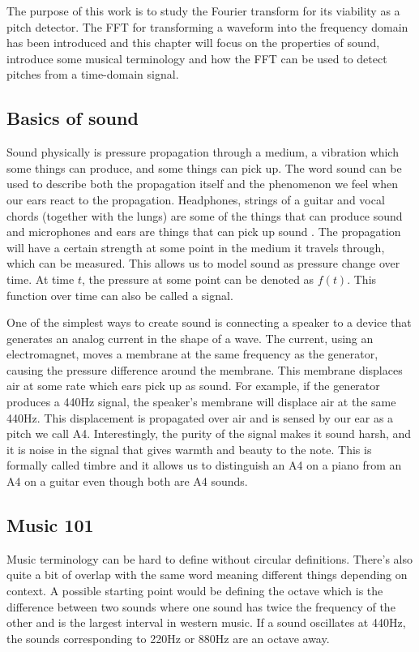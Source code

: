 The purpose of this work is to study the Fourier transform for its viability as a pitch detector. The FFT for transforming a waveform into the frequency domain has been introduced and this chapter will focus on the properties of sound, introduce some musical terminology and how the FFT can be used to detect pitches from a time-domain signal.

\subsection{Basics of sound}
Sound physically is pressure propagation through a medium, a vibration which some things can produce, and some things can pick up. The word sound can be used to describe both the propagation itself and the phenomenon we feel when our ears react to the propagation. Headphones, strings of a guitar and vocal chords (together with the lungs) are some of the things that can produce sound and microphones and ears are things that can pick up sound \cite{RossingMooreWheeler}. The propagation will have a certain strength at some point in the medium it travels through, which can be measured. This allows us to model sound as pressure change over time. At time $t$, the pressure at some point can be denoted as $f(t)$. This function over time can also be called a signal.

One of the simplest ways to create sound is connecting a speaker to a device that generates an analog current in the shape of a wave. The current, using an electromagnet, moves a membrane at the same frequency as the generator, causing the pressure difference around the membrane. This membrane displaces air at some rate which ears pick up as sound. For example, if the generator produces a 440Hz signal, the speaker's membrane will displace air at the same 440Hz. This displacement is propagated over air and is sensed by our ear as a pitch we call A4. Interestingly, the purity of the signal makes it sound harsh, and it is noise in the signal that gives warmth and beauty to the note. This is formally called timbre and it allows us to distinguish an A4 on a piano from an A4 on a guitar even though both are A4 sounds.


\subsection{Music 101} 
Music terminology can be hard to define without circular definitions. There's also quite a bit of overlap with the same word meaning different things depending on context. A possible starting point would be defining the octave which is the difference between two sounds where one sound has twice the frequency of the other and is the largest interval in western music. If a sound oscillates at 440Hz, the sounds corresponding to 220Hz or 880Hz are an octave away.


